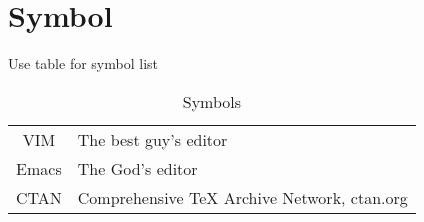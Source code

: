 \documentclass[class=NCU_thesis, crop=false]{standalone}
\begin{document}
\chapter{Symbol}
Use table for symbol list

\begin{table}[h]
	\fontsize{14}{25}\selectfont  %
	\centering
	\begin{tabular}{c@{\quad}@{：}l}
		VIM     & The best guy's editor \\ 
		Emacs   & The God's editor \\ 
		CTAN    & Comprehensive TeX Archive Network, ctan.org \\
		
	\end{tabular} 
	\caption{Symbols} %
	\label{table:symbol_def}
\end{table}
\end{document}
